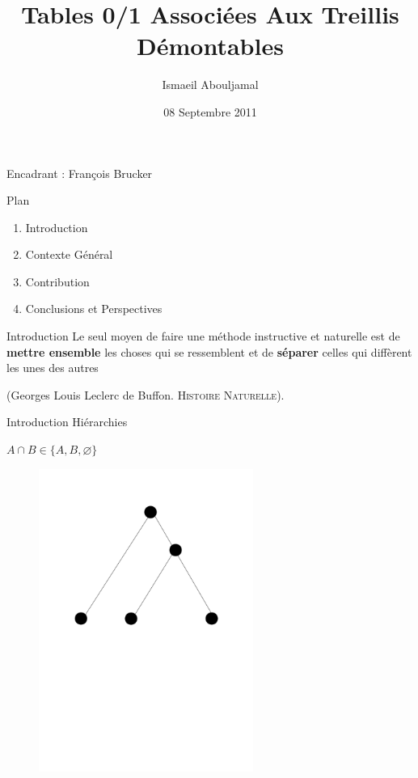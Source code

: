\documentclass{beamer}
\title{Tables 0/1 Associées Aux Treillis Démontables}
\author{Ismaeil Abouljamal}
\date{08 Septembre 2011}
\institute{LIF (UMR 6166)}
\begin{document}
  \begin{frame}
  \titlepage
  \begin{center}
  {Encadrant : François Brucker}
  \end{center}
  \end{frame}
 
  \begin{frame}{Plan}
  \begin{enumerate}
   \item Introduction	
   \item Contexte Général
   \item Contribution
   \item Conclusions et Perspectives
   \end{enumerate}
  \end{frame}

  \begin{frame}{Introduction}
  \og Le seul moyen de faire une méthode instructive et naturelle est de \textbf{mettre ensemble} les choses qui se ressemblent et de \textbf{séparer} celles qui diffèrent
  les unes des autres\fg 

  (Georges Louis Leclerc de Buffon. \textsc{Histoire Naturelle}).
  \end{frame}

  \begin{frame}{Introduction}
  \LARGE {\textrm{Hiérarchies}}

  $A \cap B \in \{A, B, \varnothing\}$
   \begin{figure}
	\includegraphics[width=7cm]{images/memoire_figure0_treillis.png} 
    \end{figure}
  \end{frame}
\end{document}

